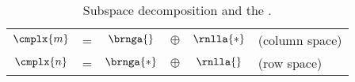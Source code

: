 \begin{table}[t]
	\begin{center}
		\begin{tabular}{cccccl}
		  $\cmplx{m}$ & = & $\brnga{}$ & $\oplus$ & $\rnlla{*}$ & (column space) \\
		  $\cmplx{n}$ & = & $\brnga{*}$ & $\oplus$ & $\rnlla{}$ & (row space) \\
		\end{tabular}
	\end{center}
	\caption{Subspace decomposition and the \ftola.}
	\label{tab:ftola spaces}
\end{table}%

\endinput  %